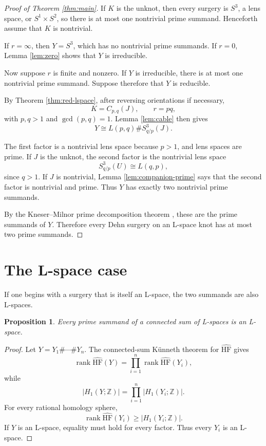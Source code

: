 \documentclass[11pt]{article}
\newtheorem{proposition}[theorem]{Proposition}
\theoremstyle{definition}
\theoremstyle{remark}
\newcommand{\HF}{\widehat{\mathrm{HF}}}
\newcommand{\Z}{\mathbb{Z}}
\begin{document}
\begin{proof}[Proof of Theorem \ref{thm:main}]
If \(K\) is the unknot, then every surgery is \(S^3\), a lens space,
or \(S^1\times S^2\), so there is at most one nontrivial prime
summand.  Henceforth assume that \(K\) is nontrivial.

If \(r=\infty\), then \(Y=S^3\), which has no nontrivial prime
summands.  If \(r=0\), Lemma \ref{lem:zero} shows that \(Y\) is
irreducible.

Now suppose \(r\) is finite and nonzero.  If \(Y\) is irreducible,
there is at most one nontrivial prime summand.  Suppose therefore
that \(Y\) is reducible.

By Theorem \ref{thm:red-lspace}, after reversing orientations if
necessary,
\[
K=C_{p,q}(J),\qquad r=pq,
\]
with \(p,q>1\) and \(\gcd(p,q)=1\).  Lemma \ref{lem:cable} then gives
\[
Y\cong L(p,q)\# S^3_{q/p}(J).
\]

The first factor is a nontrivial lens space because \(p>1\), and lens
spaces are prime.  If \(J\) is the unknot, the second factor is the
nontrivial lens space
\[
S^3_{q/p}(U)\cong L(q,p),
\]
since \(q>1\).  If \(J\) is nontrivial, Lemma
\ref{lem:companion-prime} says that the second factor is nontrivial
and prime.  Thus \(Y\) has exactly two nontrivial prime summands.

By the Kneser--Milnor prime decomposition theorem \cite{Milnor62},
these are the prime summands of \(Y\).  Therefore every Dehn surgery
on an L-space knot has at most two prime summands.
\end{proof}

\section{The L-space case}

If one begins with a surgery that is itself an L-space, the two
summands are also L-spaces.

\begin{proposition}\label{prop:summands}
Every prime summand of a connected sum of L-spaces is an L-space.
\end{proposition}

\begin{proof}
Let \(Y=Y_1\#\cdots\#Y_n\).  The connected-sum K\"unneth theorem for
\(\HF\) gives
\[
\operatorname{rank}\HF(Y)
=
\prod_{i=1}^n \operatorname{rank}\HF(Y_i),
\]
while
\[
|H_1(Y;\Z)|
=
\prod_{i=1}^n |H_1(Y_i;\Z)|.
\]
For every rational homology sphere,
\[
\operatorname{rank}\HF(Y_i)\geq |H_1(Y_i;\Z)|.
\]
If \(Y\) is an L-space, equality must hold for every factor.  Thus
every \(Y_i\) is an L-space.
\end{proof}
\end{document}
